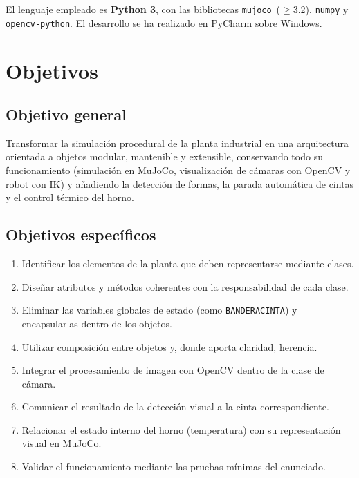 \documentclass[12pt,a4paper]{article}
\renewcommand{\_}{\guionbajo\allowbreak}
\begin{document}
El lenguaje empleado es \textbf{Python 3}, con las bibliotecas \texttt{mujoco}~($\geq$3.2),
\texttt{numpy} y \texttt{opencv-python}. El desarrollo se ha realizado en PyCharm sobre
Windows.

\clearpage
\section{Objetivos}

\subsection{Objetivo general}

Transformar la simulación procedural de la planta industrial en una arquitectura
orientada a objetos modular, mantenible y extensible, conservando todo su funcionamiento
(simulación en MuJoCo, visualización de cámaras con OpenCV y robot con IK) y añadiendo la
detección de formas, la parada automática de cintas y el control térmico del horno.

\subsection{Objetivos específicos}

\begin{enumerate}
    \item Identificar los elementos de la planta que deben representarse mediante clases.
    \item Diseñar atributos y métodos coherentes con la responsabilidad de cada clase.
    \item Eliminar las variables globales de estado (como \texttt{BANDERA\_CINTA\_1}) y
          encapsularlas dentro de los objetos.
    \item Utilizar composición entre objetos y, donde aporta claridad, herencia.
    \item Integrar el procesamiento de imagen con OpenCV dentro de la clase de cámara.
    \item Comunicar el resultado de la detección visual a la cinta correspondiente.
    \item Relacionar el estado interno del horno (temperatura) con su representación
          visual en MuJoCo.
    \item Validar el funcionamiento mediante las pruebas mínimas del enunciado.
\end{enumerate}
\end{document}
